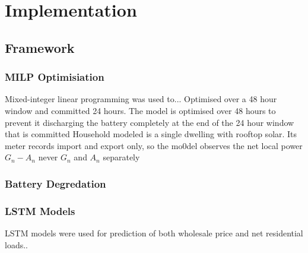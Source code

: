 \chapter{Implementation}


\section{Framework}

\subsection{MILP Optimisiation}
Mixed-integer linear programming was used to...
Optimised over a 48 hour window and committed 24 hours. The model is optimised over 48 hours to prevent it discharging the battery completely at the end of the 24 hour window that is committed
Household modeled is a single dwelling with rooftop solar. Its meter records import and export only, so the mo0del observes the net local power $G_n - A_n$ never $G_n$ and $A_n$ separately

\subsection{Battery Degredation}


\subsection{LSTM Models}
LSTM models were used for prediction of both wholesale price and net residential loads..